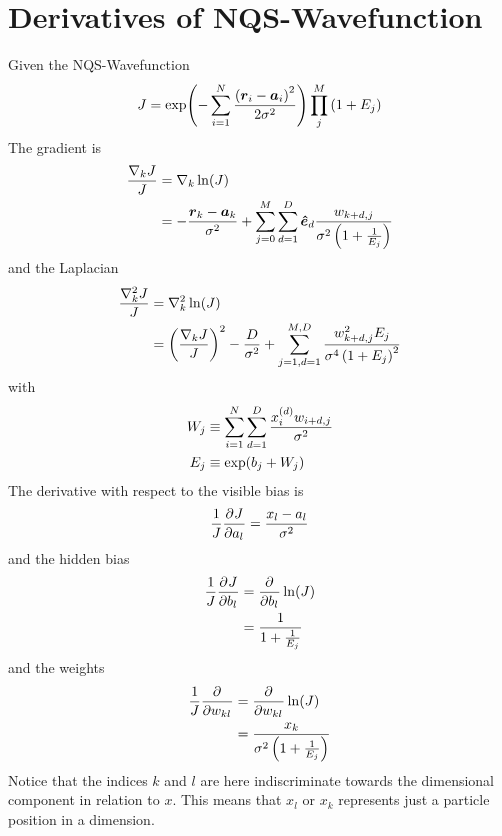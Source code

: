 \section{Derivatives of NQS-Wavefunction}
    Given the NQS-Wavefunction
        \begin{equation}
            J = \exp(-\suml{i=1}{N} \frac{\left(\blds{r}_i -
            \blds{a}_i\right)^2}{2\sigma^2})\prod\limits^{M}_j \left(1 +
            E_j\right)
        \end{equation}
    The gradient is
        \begin{align}
            \frac{\nabla_k J}{J} &= \nabla_k \ln(J) \nonumber \\
            &= -\frac{\blds{r}_k - \blds{a}_k}{\sigma^2} +
            \suml{j=0}{M}\suml{d=1}{D} \blds{\hat{e}}_d
            \frac{w_{k+d,j}}{\sigma^2\left(1 + \frac{1}{E_j}\right)}
        \end{align}
    and the Laplacian
        \begin{align}
            \frac{\nabla^2_k J}{J} &= \nabla^2_k \ln(J) \nonumber \\ &=
            \left(\frac{\nabla_k J}{J}\right)^2- \frac{D}{\sigma^2} +
            \suml{j=1,d=1}{M,D} \frac{w^2_{k+d,j}E_j}{\sigma^4\left(1 +
            E_j\right)^2}
        \end{align}
    with 
        \begin{equation}
            \begin{aligned}
                W_j &\equiv \suml{i=1}{N}\suml{d=1}{D}
                \frac{x^{(d)}_iw_{i+d,j}}{\sigma^2} \\
                E_j &\equiv \exp(b_j + W_j)
            \end{aligned}
        \end{equation}
    The derivative with respect to the visible bias is
        \begin{equation}
            \frac{1}{J}\prd{a_l}[J] = \frac{x_l - a_l}{\sigma^2}
        \end{equation}
    and the hidden bias
        \begin{align}
            \frac{1}{J}\prd{b_l}[J] &= \prd{b_l}\ln(J) \nonumber \\
            &= \frac{1}{1 + \frac{1}{E_j}}
        \end{align}
    and the weights
        \begin{align}
            \frac{1}{J}\prd{w_{kl}} &= \prd{w_{kl}}\ln(J) \nonumber \\
            &= \frac{x_k}{\sigma^2\left(1 + \frac{1}{E_j}\right)}
        \end{align}
    Notice that the indices $k$ and $l$ are here indiscriminate towards the
    dimensional component in relation to $x$. This means that $x_l$ or $x_k$
    represents just a particle position in a dimension.

